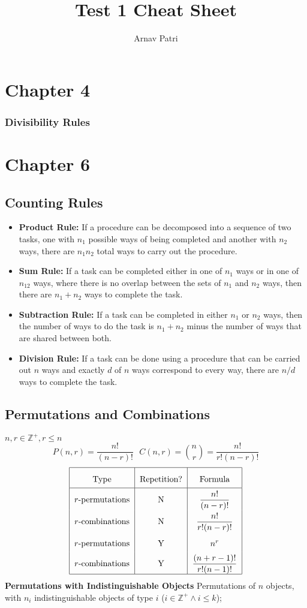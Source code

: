 \documentclass[12pt, A4, twocolumn]{article}
\title{Test 1 Cheat Sheet}
\author{Arnav Patri}
\newcommand{\Z}{\mathbb{Z}}
\begin{document}
	\section*{Chapter 4}
		\subsubsection*{Divisibility Rules}
	\section*{Chapter 6}
		\subsection*{Counting Rules}
			\begin{itemize}
				\item
					\textbf{Product Rule:} If a procedure can be decomposed into a sequence of two tasks, one with \(n_1\) possible ways of being completed and another with \(n_2\) ways, there are \(n_1n_2\) total ways to carry out the procedure.
				\item
					\textbf{Sum Rule:} If a task can be completed either in one of \(n_1\) ways or in one of \(n_12\) ways, where there is no overlap between the sets of \(n_1\) and \(n_2\) ways, then there are \(n_1 + n_2\) ways to complete the task.
				\item
					\textbf{Subtraction Rule:} If a task can be completed in either \(n_1\) or \(n_2\) ways, then the number of ways to do the task is \(n_1 + n_2\) minus the number of ways that are shared between both.
				\item
					\textbf{Division Rule:} If a task can be done using a procedure that can be carried out \(n\) ways and exactly \(d\) of \(n\) ways correspond to every way, there are \(n/d\) ways to complete the task.
			\end{itemize}
		\subsection*{Permutations and Combinations}
			\(n, r \in \Z^+, r \le n\)
			\[P(n, r) = \frac{n!}{(n - r)!} \,\,\,\, C(n, r) = \binom{n}{r} = \frac{n!}{r!(n - r)!}\]
			\[\def\arraystretch{2}\begin{tabular}{|c|c|c|}\hline
				Type & Repetition? & Formula \\\hline
				\(r\)-permutations & N & \(\dfrac{n!}{(n - r)!}\) \\
				\(r\)-combinations & N & \(\dfrac{n!}{r!(n - r)!}\) \\
				\(r\)-permutations & Y & \(n^r\) \\
				\(r\)-combinations & Y & \(\dfrac{(n + r - 1)!}{r!(n - 1)!}\) \\\hline
			\end{tabular}\]
			\textbf{Permutations with Indistinguishable Objects}
				Permutations of \(n\) objects, with \(n_i\) indistinguishable objects of type \(i\) (\(i \in \Z^+ \land i \le k\));
					
\end{document}
